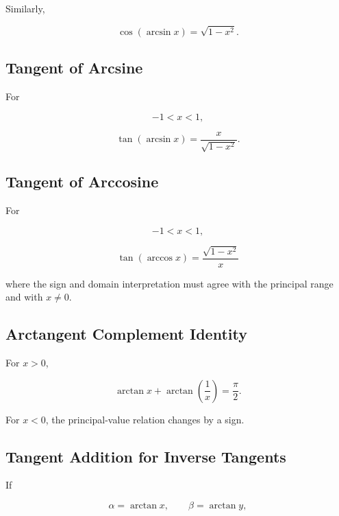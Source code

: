Similarly,

\[
\boxed{
\cos(\arcsin x)
=
\sqrt{1-x^2}.
}
\]

\subsection{Tangent of Arcsine}
\label{subsec:tangent-arcsine}

For

\[
-1<x<1,
\]

\[
\boxed{
\tan(\arcsin x)
=
\frac{x}{\sqrt{1-x^2}}.
}
\]

\subsection{Tangent of Arccosine}
\label{subsec:tangent-arccosine}

For

\[
-1<x<1,
\]

\[
\boxed{
\tan(\arccos x)
=
\frac{\sqrt{1-x^2}}{x}
}
\]

where the sign and domain interpretation must agree with the principal range
and with \(x\neq0\).

\subsection{Arctangent Complement Identity}
\label{subsec:arctangent-complement}

For \(x>0\),

\[
\boxed{
\arctan x
+
\arctan\left(\frac1x\right)
=
\frac{\pi}{2}.
}
\]

For \(x<0\), the principal-value relation changes by a sign.

\subsection{Tangent Addition for Inverse Tangents}
\label{subsec:inverse-tangent-addition}

If

\[
\alpha=\arctan x,
\qquad
\beta=\arctan y,
\]


